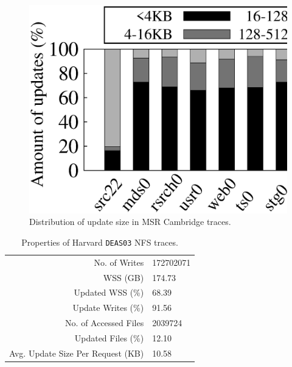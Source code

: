 \begin{figure}[t]
    \centering
    \includegraphics[width=0.9\linewidth]{charts/msr_dist/eps/msr_dist}
    \vspace{-3pt}
    \caption{Distribution of update size in MSR Cambridge traces.}
    \label{fig:msr_dist}
    \vspace{-6pt}
\end{figure}

\begin{table}[t] \footnotesize
  \centering
    \begin{tabular}{rl}
    \toprule
    No. of Writes & 172702071 \\
    WSS (GB) & 174.73 \\
    Updated WSS (\%) & 68.39 \\
    Update Writes (\%) & 91.56 \\
    No. of Accessed Files & 2039724 \\
    Updated Files (\%) & 12.10 \\
    Avg. Update Size Per Request (KB) & 10.58 \\
    \bottomrule
    \end{tabular}%
  \caption{Properties of Harvard \texttt{DEAS03} NFS traces.}
  \label{table:harvard}%
  \vspace{-2pt}
\end{table}%

